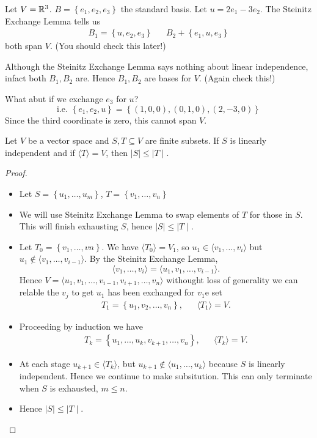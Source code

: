 \begin{eg}
	Let $V = \mathbb{R}^{3}$. $B = \left\{ e_1,e_2,e_3  \right\}$ the standard basis. Let $u=2e_1-3e_2$. The Steinitz Exchange Lemma tells us
	\begin{align*}
		B_1=\left\{ u,e_2,e_3 \right\} & & B_2+\left\{ e_1,u,e_3 \right\} 
	\end{align*}
	both span $V$. (You should check this later!)

	Although the Steinitz Exchange Lemma says nothing about linear independence, infact both $B_1,B_2$ are.
	Hence $B_1,B_2$ are bases for $V$. (Again check this!)
	
	What abut if we exchange $e_3$ for $u$?
	\[
		\text{i.e. } \left\{ e_1,e_2,u \right\} = \left\{ \left( 1,0,0 \right) ,\left( 0,1,0 \right) ,\left( 2,-3,0 \right)  \right\} 
\] Since the third coordinate is zero, this cannot span $V$.
\end{eg}

\begin{theorem}
	Let $V$ be a vector space and $S,T \subseteq V$ are finite subsets. If $S$ is linearly independent and if $\langle T \rangle = V$, then $\mid S \mid \le  \mid T \mid$.
\end{theorem}
\begin{proof}
	\begin{itemize}
		\item Let $S = \left\{ u_1,\ldots,u_m \right\} $, $T=\left\{ v_1,\ldots,v_n \right\} $
		\item We will use Steinitz Exchange Lemma to swap elements of $T$ for those in $S$. This will finish exhausting $S$, hence $\mid S \mid \le \mid T \mid$.
		\item Let $T_0=\left\{ v_1,\ldots,vn \right\} $. We have $ \langle T_0 \rangle = V_1$, so $u_1 \in  \langle v_1,\ldots,v_i \rangle$ but $u_1 \not\in  \langle v_1,\ldots,v_{i-1} \rangle$. By the Steinitz Exchange Lemma,
			\[
			\langle v_1,\ldots,v_i \rangle = \langle u_1,v_1,\ldots,v_{i-1} \rangle.
			\]
			Hence $V= \langle u_1,v_1,\ldots,v_{i-1},v_{i+1},\ldots,v_n \rangle$ withought loss of generality we can relable the $v_j$ to get $u_1$ has been exchanged for $v_1$e set 
			\begin{align*}
				T_1=\left\{ u_1,v_2,\ldots,v_n \right\}, & & \langle T_1 \rangle = V.
			\end{align*}
		\item Proceeding by induction we have
			\begin{align*}
					T_k = \left\{u_1,\ldots,u_k,v_{k+1},\ldots,v_{n}  \right\}, & & \langle T_k \rangle = V.
			\end{align*}
		\item At each stage $u_{k+1} \in \langle T_{k} \rangle$, but $u_{k+1} \not\in \langle u_1,\ldots,u_k \rangle$ because $S$ is linearly independent. Hence we continue to make subsitution. This can only terminate when $S$ is exhausted, $m \le n$.
		\item Hence $ \mid S \mid \le  \mid T \mid$.
				\end{itemize}
\end{proof}

